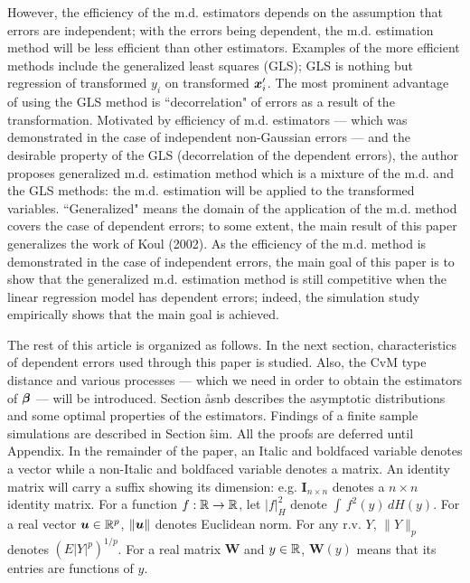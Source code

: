 However, the efficiency of the m.d.\,\,estimators depends on the assumption that errors are independent; with the errors being dependent, the m.d.\,\,estimation method will be less efficient than other estimators. Examples of the more efficient methods include the generalized least squares (GLS); GLS is nothing but regression of transformed $y_{i}$ on transformed $\mbox{\boldmath $x$}_{i}'$. The most prominent advantage of using the GLS method is ``decorrelation" of errors as a result of the transformation. Motivated by efficiency of m.d.\,\,estimators --- which was demonstrated in the case of independent non-Gaussian errors --- and the desirable property of the GLS (decorrelation of the dependent errors), the author proposes generalized m.d.\,\,estimation method which is a mixture of the m.d.\,\,and the GLS methods: the m.d.\,\,estimation will be applied to the transformed variables. ``Generalized" means the domain of the application of the m.d.\,\,method covers the case of dependent errors; to some extent, the main result of this paper generalizes the work of Koul (2002). As the efficiency of the m.d.\,\,method is demonstrated in the case of independent errors, the main goal of this paper is to show that the generalized m.d.\,\,estimation method is still competitive when the linear regression model has dependent errors; indeed, the simulation study empirically shows that the main goal is achieved.

The rest of this article is organized as follows. In the next section, characteristics of dependent errors used through this paper is studied. Also, the CvM type distance and various processes --- which we need in order to obtain the estimators of $\mbox{\boldmath $\beta$}$ --- will be introduced. Section \r{asnb} describes the asymptotic distributions and some optimal properties of the estimators. Findings of a finite sample simulations are described in Section \r{sim}. All the proofs are deferred until Appendix. In the remainder of the paper, an Italic and boldfaced variable denotes a vector while a non-Italic and boldfaced variable denotes a matrix. An identity matrix will carry a suffix showing its dimension: e.g. $\textbf{I}_{n\times n}$ denotes a $n\times n$ identity matrix. For a function $f:{\mathbb R}\rightarrow {\mathbb R}$, let $|f|_{H}^{2}$ denote $\int\,f^{2}(y)\,dH(y)$. For a real vector $\mbox{\boldmath $u$}\in{\mathbb R}^{p}$, $\|\mbox{\boldmath $u$}\|$ denotes Euclidean norm. For any r.v.\,\,$Y$, $\|Y\|_{p}$ denotes $(E |Y|^{p})^{1/p}$. For a real matrix $\textbf{W}$ and $y\in{\mathbb R}$, $\textbf{W}(y)$ means that its entries are functions of $y$.


